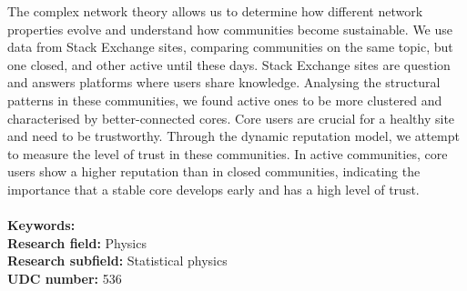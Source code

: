 The complex network theory allows us to determine how different network properties evolve and understand how communities become sustainable. We use data from Stack Exchange sites, comparing communities on the same topic, but one closed, and other active until these days. Stack Exchange sites are question and answers platforms where users share knowledge. Analysing the structural patterns in these communities, we found active ones to be more clustered and characterised by better-connected cores. Core users are crucial for a healthy site and need to be trustworthy. Through the dynamic reputation model, we attempt to measure the level of trust in these communities. In active communities, core users show a higher reputation than in closed communities, indicating the importance that a stable core develops early and has a high level of trust. \\~\\
{\textbf {Keywords:}} \\ %
{\textbf {Research field:}} Physics \\
{\textbf {Research subfield:}} Statistical physics\\
\textbf{UDC number:} 536 %




